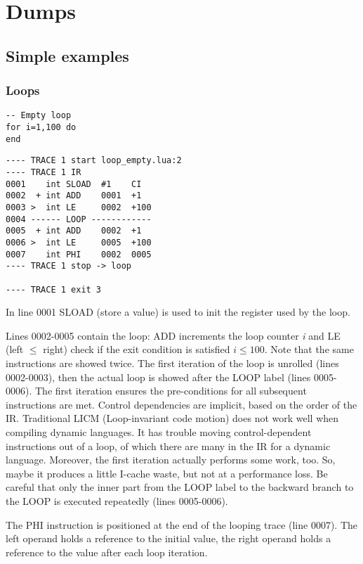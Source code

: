 \chapter{Dumps}

\section{Simple examples}

\subsection{Loops}

\begin{lstlisting}[style=LuaStyle]
-- Empty loop
for i=1,100 do
end
\end{lstlisting}

\begin{lstlisting}[style=DumpStyle]
---- TRACE 1 start loop_empty.lua:2
---- TRACE 1 IR
0001    int SLOAD  #1    CI
0002  + int ADD    0001  +1  
0003 >  int LE     0002  +100
0004 ------ LOOP ------------
0005  + int ADD    0002  +1  
0006 >  int LE     0005  +100
0007    int PHI    0002  0005
---- TRACE 1 stop -> loop

---- TRACE 1 exit 3
\end{lstlisting}

In line 0001 SLOAD (store a value) is used to init the register used by the loop. 

Lines 0002-0005 contain the loop: ADD increments the loop counter \textit{i} and LE (left $\leq$ right) check if the exit condition is satisfied $i\leq100$. Note that the same instructions are showed twice. The first iteration of the loop is unrolled (lines 0002-0003), then the actual loop is showed after the LOOP label (lines 0005-0006). The first iteration ensures the pre-conditions for all subsequent instructions are met. Control dependencies are implicit, based on
the order of the IR. Traditional LICM (Loop-invariant code motion) does not work well when compiling dynamic languages. It has trouble moving control-dependent instructions out of a loop, of which there are many in the IR for a dynamic language. Moreover, the first iteration actually performs some work, too. So, maybe it produces a little I-cache waste, but not at a performance loss. Be careful that only the inner part from the LOOP label to the backward branch to the LOOP is executed repeatedly (lines 0005-0006).

The PHI instruction is  positioned at the end of the looping trace (line 0007). The left operand holds a reference to the initial value, the right operand holds a reference to the value after each loop iteration.

